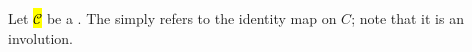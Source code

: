\begin{definition} \label{definition:trivial_involution_on_an_object_in_a_category}
Let \hl{$\mathcal{C}$} be a . 
The  simply refers to the identity map on $C$; note that it is an involution.
\end{definition}